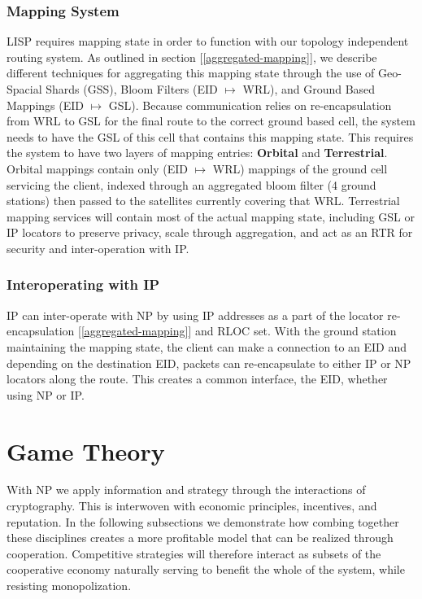 \documentclass[11pt]{article}
\begin{document}
\subsubsection{Mapping System}

LISP requires mapping state in order to function with our topology independent routing system.
As outlined in section [\ref{aggregated-mapping}], we describe different techniques for aggregating this mapping state through the use of Geo-Spacial Shards (GSS), Bloom Filters (EID $\longmapsto$ WRL), and Ground Based Mappings (EID $\longmapsto$ GSL).
Because communication relies on re-encapsulation from WRL to GSL  for the final route to the correct ground based cell, the system needs to have the GSL of this cell that contains this mapping state.
This requires the system to have two layers of mapping entries: \textbf{Orbital} and \textbf{Terrestrial}.
Orbital mappings contain only (EID $\longmapsto$ WRL) mappings of the ground cell servicing the client, indexed through an aggregated bloom filter (4 ground stations) then passed to the satellites currently covering that WRL.
Terrestrial mapping services will contain most of the actual mapping state, including GSL or IP locators to preserve privacy, scale through aggregation, and act as an RTR for security and inter-operation with IP.


\subsubsection{Interoperating with IP}

\noindent IP can inter-operate with NP by using IP addresses as a part of the locator re-encapsulation [\ref{aggregated-mapping}] and RLOC set.
With the ground station maintaining the mapping state, the client can make a connection to an EID and depending on the destination EID, packets can re-encapsulate to either IP or NP locators along the route.
This creates a common interface, the EID, whether using NP or IP.




\section{Game Theory}

With NP we apply information and strategy through the interactions of cryptography.
This is interwoven with economic principles, incentives, and reputation.
In the following subsections we demonstrate how combing together these disciplines creates a more profitable model that can be realized through cooperation.
Competitive strategies will therefore interact as subsets of the cooperative economy naturally serving to benefit the whole of the system, while resisting monopolization.
\end{document}
